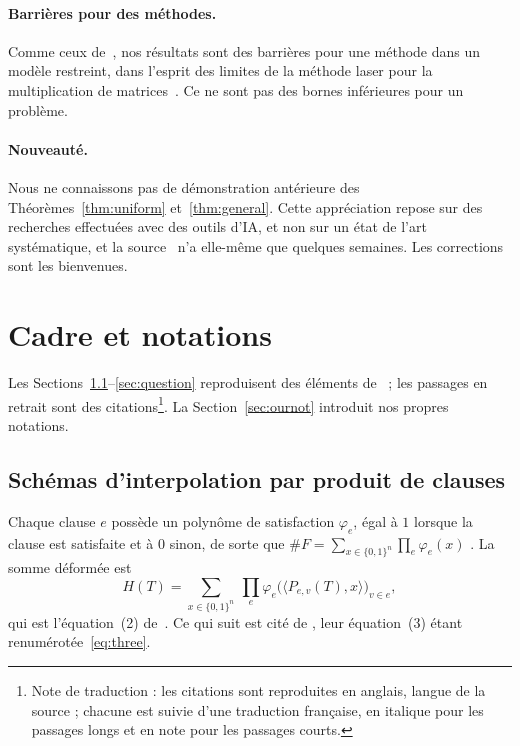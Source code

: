 \documentclass[11pt,a4paper]{article}
\theoremstyle{definition}
\theoremstyle{remark}
\begin{document}
\paragraph{Barrières pour des méthodes.} Comme ceux de~\cite{DL}, nos résultats sont des
barrières pour une méthode dans un modèle restreint, dans l'esprit des limites de la méthode
laser pour la multiplication de matrices~\cite{AFL15,AVW18}. Ce ne sont pas des bornes
inférieures pour un problème.

\paragraph{Nouveauté.} Nous ne connaissons pas de démonstration antérieure des
Théorèmes~\ref{thm:uniform} et~\ref{thm:general}. Cette appréciation repose sur des
recherches effectuées avec des outils d'IA, et non sur un état de l'art systématique, et la
source~\cite{DL} n'a elle-même que quelques semaines. Les corrections sont les bienvenues.

\section{Cadre et notations}\label{sec:setting}

Les Sections~\ref{sec:def}--\ref{sec:question} reproduisent des éléments de~\cite{DL} ; les
passages en retrait sont des citations\footnote{Note de traduction : les citations sont
reproduites en anglais, langue de la source ; chacune est suivie d'une traduction française,
en italique pour les passages longs et en note pour les passages courts.}. La
Section~\ref{sec:ournot} introduit nos propres notations.

\subsection{Schémas d'interpolation par produit de clauses}\label{sec:def}

Chaque clause $e$ possède un polynôme de satisfaction $\varphi_e$, égal à $1$ lorsque la
clause est satisfaite et à $0$ sinon, de sorte que
$\#F=\sum_{x\in\{0,1\}^n}\prod_e\varphi_e(x)$ \cite[(1)]{DL}. La somme déformée est
\begin{equation}\tag{DL.2}\label{eq:H}
H(T)=\sum_{x\in\{0,1\}^n}\ \prod_e\varphi_e\bigl(\langle P_{e,v}(T),x\rangle\bigr)_{v\in e},
\end{equation}
qui est l'équation~(2) de~\cite{DL}. Ce qui suit est cité de \cite[Section~5]{DL}, leur
équation~(3) étant renumérotée~\eqref{eq:three}.
\end{document}
